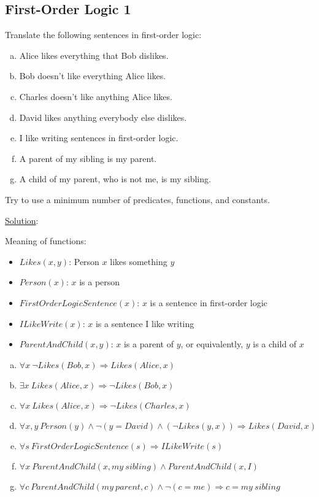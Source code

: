 \documentclass[11pt, answers]{exam}
\begin{document}
%
%
\begin{questions}
\section{First-Order Logic 1}
\question

Translate the following sentences in first-order logic:

\begin{enumerate}[a.]
\item Alice likes everything that Bob dislikes.
\item Bob doesn't like everything Alice likes.
\item Charles doesn't like anything Alice likes.
\item David likes anything everybody else dislikes.
\item I like writing sentences in first-order logic.
\item A parent of my sibling is my parent.
\item A child of my parent, who is not me, is my sibling.
\end{enumerate}

Try to use a minimum number of predicates, functions, and constants.

\underline{Solution}:

Meaning of functions:
\begin{itemize}
	\item $Likes(x, y)$: Person $x$ likes something $y$
	\item $Person(x)$: $x$ is a person
	\item $FirstOrderLogicSentence(x)$: $x$ is a sentence in first-order logic
	\item $ILikeWrite(x)$: $x$ is a sentence I like writing
	\item $ParentAndChild(x, y)$: $x$ is a parent of $y$, or equivalently, $y$ is a child of $x$
\end{itemize}

\begin{enumerate}[a.]
	\item $\forall x \ \neg Likes(Bob, x) \Rightarrow Likes(Alice, x)$
	\item  $\exists x \ Likes(Alice, x) \Rightarrow \neg Likes(Bob, x)$
	\item $\forall x \ Likes(Alice, x) \Rightarrow \neg Likes(Charles, x)$
	\item $\forall x,y \ Person(y) \wedge \neg(y = David) \wedge (\neg Likes(y, x)) \Rightarrow Likes(David, x)$ 
	\item $\forall s \ FirstOrderLogicSentence(s) \Rightarrow ILikeWrite(s)$
	\item $\forall x \ ParentAndChild(x, my\ sibling) \wedge ParentAndChild(x, I)$
	\item $\forall c \ ParentAndChild(my\ parent, c) \wedge \neg (c = me) \Rightarrow c = my\ sibling$
\end{enumerate}
\end{questions}
\end{document}
